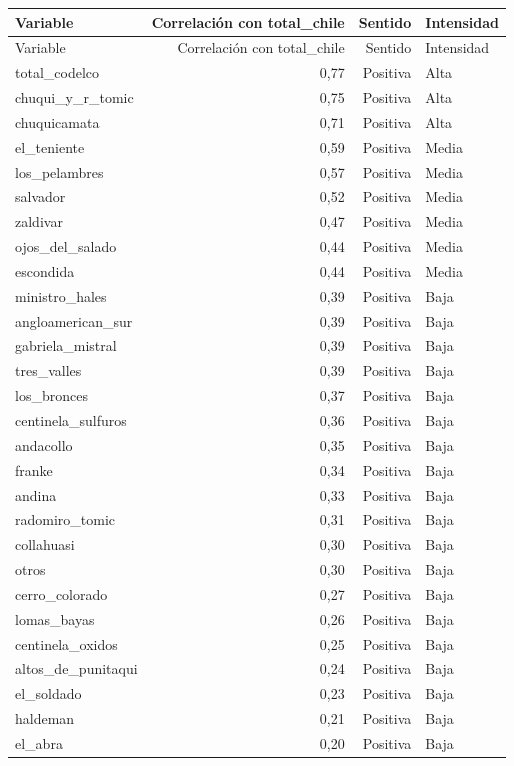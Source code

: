 \begin{longtable}{p{}rrp{}}
\toprule
Variable & Correlación con total\_chile & Sentido & Intensidad \\
\midrule
\endfirsthead
\toprule
Variable & Correlación con total\_chile & Sentido & Intensidad \\
\midrule
\endhead
total\_codelco & 0,77 & Positiva & Alta \\
chuqui\_y\_r\_tomic & 0,75 & Positiva & Alta \\
chuquicamata & 0,71 & Positiva & Alta \\
el\_teniente & 0,59 & Positiva & Media \\
los\_pelambres & 0,57 & Positiva & Media \\
salvador & 0,52 & Positiva & Media \\
zaldivar & 0,47 & Positiva & Media \\
ojos\_del\_salado & 0,44 & Positiva & Media \\
escondida & 0,44 & Positiva & Media \\
ministro\_hales & 0,39 & Positiva & Baja \\
angloamerican\_sur & 0,39 & Positiva & Baja \\
gabriela\_mistral & 0,39 & Positiva & Baja \\
tres\_valles & 0,39 & Positiva & Baja \\
los\_bronces & 0,37 & Positiva & Baja \\
centinela\_sulfuros & 0,36 & Positiva & Baja \\
andacollo & 0,35 & Positiva & Baja \\
franke & 0,34 & Positiva & Baja \\
andina & 0,33 & Positiva & Baja \\
radomiro\_tomic & 0,31 & Positiva & Baja \\
collahuasi & 0,30 & Positiva & Baja \\
otros & 0,30 & Positiva & Baja \\
cerro\_colorado & 0,27 & Positiva & Baja \\
lomas\_bayas & 0,26 & Positiva & Baja \\
centinela\_oxidos & 0,25 & Positiva & Baja \\
altos\_de\_punitaqui & 0,24 & Positiva & Baja \\
el\_soldado & 0,23 & Positiva & Baja \\
haldeman & 0,21 & Positiva & Baja \\
el\_abra & 0,20 & Positiva & Baja \\

\end{longtable}
